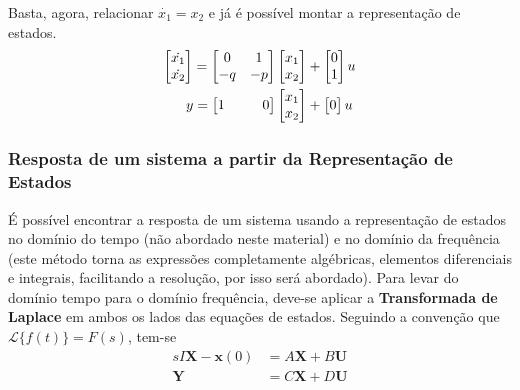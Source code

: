 \documentclass{article}
\numberwithin{equation}{section}
\begin{document}
\noindent Basta, agora, relacionar $\dot{x_{1}}=x_{2}$ e já é possível montar a representação de estados.
\begin{equation*}
    \begin{split}%
        \begin{bmatrix}
            \dot{x_{1}}  \\
            \dot{x_{2}}
        \end{bmatrix}
        = %
        \begin{bmatrix}
            0 & 1\\
            -q & -p\\
        \end{bmatrix}
        &\begin{bmatrix}
            x_{1} \\
            x_{2}
        \end{bmatrix}
        + %
        \begin{bmatrix}
            0\\
            1
        \end{bmatrix}
        u
     \\
        y =
        \begin{bmatrix}
           1\hspace{0.6cm} & 0\\
        \end{bmatrix}
        &\begin{bmatrix}
            x_{1} \\
            x_{2}
        \end{bmatrix}
        + \hspace{0.005cm}
        \begin{bmatrix}
            0
        \end{bmatrix}
        u
    \end{split}
\end{equation*}

\subsubsection{Resposta de um sistema a partir da Representação de Estados}
\label{subsubsec:est_resposta}

É possível encontrar a resposta de um sistema usando a representação de estados no domínio do tempo (não abordado neste material) e no domínio da frequência (este método torna as expressões completamente algébricas, elementos diferenciais e integrais, facilitando a resolução, por isso será abordado). Para levar do domínio tempo para o domínio frequência, deve-se aplicar a \textbf{Transformada de Laplace} em ambos os lados das equações de estados. Seguindo a convenção que $\mathscr{L}\{f(t)\}=F(s)$, tem-se
\begin{equation*}
    \begin{split}
        sI\textbf{X}-\textbf{x}(0)&=A\textbf{X}+B\textbf{U} \\
                    \textbf{Y}&=C\textbf{X}+D\textbf{U}
    \end{split}
\end{equation*}
\end{document}
